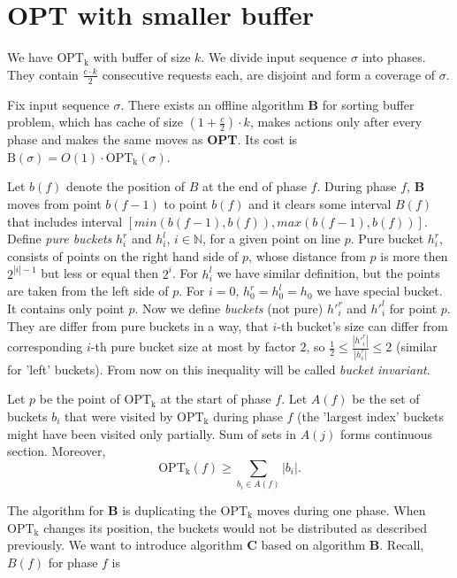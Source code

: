 \section{OPT with smaller buffer}
We have $\mathrm{OPT_k}$ with buffer of size $k$. We divide input sequence 
$\sigma$ into phases. They 
contain $\frac{c \cdot k}{2}$ consecutive requests each, are disjoint and form 
a 
coverage of $\sigma$.
\begin{lemma}
Fix input sequence $\sigma$. There exists an offline algorithm \textbf{B} 
for sorting buffer problem, which has cache of size $(1 + 
\frac{c}{2}) \cdot k$, makes actions only after every phase and makes the same 
moves as \textbf{OPT}. Its cost is $\mathrm{B}(\sigma) = O(1) \cdot 
\mathrm{OPT_k}(\sigma)$.
\label{lem:algorithm_B}
\end{lemma}
Let $b(f)$ denote the position of $B$ at the end of phase $f$. During phase 
$f$, \textbf{B} moves from point $b(f-1)$ to point $b(f)$ and it clears some 
interval $B(f)$ that includes interval $[min(b(f-1), b(f)), max(b(f-1), 
b(f))]$.
Define \textit{pure buckets} $h^r_i$ and $h^l_i$, $i \in \mathbb{N}$, for a 
given point on line $p$. Pure bucket 
$h^r_i$, consists of points on the right hand side of $p$, whose 
distance 
from $p$ is more then $2^{|i| - 1}$ but less or equal then $2^i$. For $h^l_i$ 
we have similar definition, but the points are taken from the 
left side of $p$. For $i=0$, $h^r_0 = h^l_0 = h_0$ we have special bucket. It 
contains only point $p$. Now we define \textit{buckets} (not pure) 
$h'^r_i$ and $h'^l_i$ for point $p$. They are differ from pure buckets in a 
way, that $i$-th bucket's size can differ from corresponding $i$-th pure bucket 
size at most by factor $2$, so $\frac{1}{2} \leq \frac{|h'^r_i|}{|h^r_i|} \leq 
2$ (similar for 'left' buckets). From now on this inequality will be called 
\textit{bucket invariant}.
\begin{observe}
Let $p$ be the point of $\mathrm{OPT_k}$ at the start of phase $f$. Let $A(f)$ 
be 
the set of buckets $b_i$ that were visited by $\mathrm{OPT_k}$ during phase $f$ 
(the 
'largest index' buckets might have been visited only partially. Sum of sets in 
$A(j)$ 
forms continuous section. Moreover, $$\mathrm{OPT_k}(f) \geq \sum_{b_i \in 
A(f)} |b_i|.$$
\end{observe}
The algorithm for \textbf{B} is duplicating the $\mathrm{OPT_k}$ moves during 
one phase. When $\mathrm{OPT_k}$ changes its position, the buckets would not be 
distributed as described previously. We want to introduce algorithm 
\textbf{C} based on algorithm \textbf{B}. Recall, $B(f)$ for phase $f$ is 

